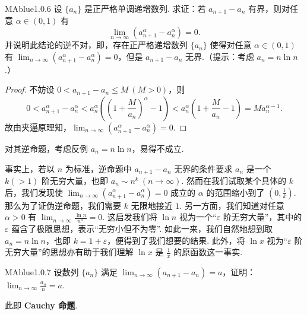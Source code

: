 \begin{problem}{MAblue}{1.0.6}
    设 $\{ a_n \}$ 是正严格单调递增数列. 求证：若 $a_{n+1} - a_n$ 有界，则对任意 $\alpha \in (0, 1)$ 有
    \[
        \lim_{n \to \infty} \left( a_{n+1}^\alpha - a_n^\alpha \right) = 0.
    \]
    并说明此结论的逆不对，即，存在正严格递增数列 $\{ a_n \}$ 使得对任意 $\alpha \in (0, 1)$ 有 $\lim_{n \to \infty} \left( a_{n+1}^\alpha - a_n^\alpha \right) = 0$，但是 $a_{n+1} - a_n$ 无界.（提示：考虑 $a_n = n \ln n$.）
\end{problem}

\begin{proof}
    不妨设 $0 < a_{n+1} - a_n \leqslant M \ (M > 0)$，则
    \[
        0 < a_{n+1}^\alpha - a_n^\alpha < a_n^\alpha \left( \left( 1 + \frac M {a_n} \right)^\alpha - 1 \right) < a_n^\alpha \left( 1 + \frac M {a_n} - 1 \right) = M a_n^{\alpha-1}.
    \]
    故由夹逼原理知，$\lim_{n \to \infty} \left(a_{n+1}^{\alpha}-a_n^{\alpha}\right) = 0$.
\end{proof}

{\flushleft 对其逆命题，考虑反例 $a_n = n \ln n$，易得不成立.}

\begin{mnote}
    事实上，若以 $n$ 为标准，逆命题中 $a_{n+1} - a_n$ 无界的条件要求 $a_n$ 是一个 $k (> 1)$ 阶无穷大量，也即 $a_n \sim n^k \ (n \to \infty)$. 然而在我们试取某个具体的 $k$ 后，我们发现使 $\lim_{n \to \infty} \left( a_{n+1}^\alpha - a_n^\alpha \right) = 0$ 成立的 $\alpha$ 的范围缩小到了 $\left( 0, \frac 1 k \right)$. 那么为了证伪逆命题，我们需要 $k$ 无限地接近 $1$. 另一方面，我们知道对任意 $\alpha > 0$ 有 $\lim_{n \to \infty} \frac{\ln n}{n^\alpha} = 0$. 这启发我们将 $\ln n$ 视为一个“$\varepsilon$ 阶无穷大量”，其中的 $\varepsilon$ 蕴含了极限思想，表示“无穷小但不为零”. 如此一来，我们自然地想到取 $a_n = n \ln n$，也即 $k = 1 + \varepsilon$，便得到了我们想要的结果. 此外，将 $\ln x$ 视为“$\varepsilon$ 阶无穷大量”的思想亦有助于我们理解 $\ln x$ 是 $\frac 1 x$ 的原函数这一事实.
\end{mnote}

\begin{problem}{MAblue}{1.0.7}
    设数列 $\{ a_n \}$ 满足 $\lim_{n \to \infty} (a_{n+1} - a_n) = a$，证明：$\lim_{n \to \infty} \frac {a_n} n = a$.
\end{problem}

{\flushleft 此即 \textbf{Cauchy 命题}.}

